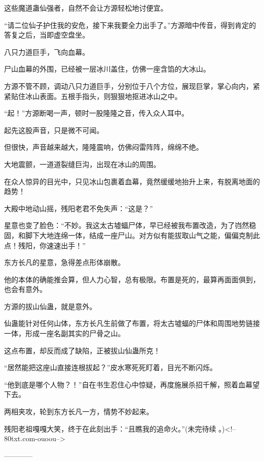 \begin{this_body}
这些魔道蛊仙强者，自然不会让方源轻松地讨便宜。

“请二位仙子护住我的安危，接下来我要全力出手了。”方源暗中传音，得到肯定的答复之后，当即虚空盘坐。

八只力道巨手，飞向血幕。

尸山血幕的外围，已经被一层冰川盖住，仿佛一座含馅的大冰山。

方源不管不顾，调动八只力道巨手，分别位于八个方位，展现巨掌，掌心向内，紧紧贴住冰山表面。五根手指头，则狠狠地抠进冰山之中。

“起！”方源断喝一声，顿时一股隆隆之音，传入众人耳中。

起先这股声音，只是微不可闻。

但很快，声音越来越大，隆隆震响，仿佛闷雷阵阵，绵绵不绝。

大地震颤，一道道裂缝巨沟，出现在冰山的周围。

在众人惊异的目光中，只见冰山包裹着血幕，竟然缓缓地抬升上来，有脱离地面的趋势！

大殿中地动山摇，残阳老君不免失声：“这是？”

星意也变了脸色：“不妙。我这太古墟蝠尸体，早已经被我布置改造，为了岿然稳固，和脚下大地连绵一体，结成一座尸山。对方似有能拔取山气之能，偏偏克制此点！残阳，你速速出手！”

东方长凡的星意，急得差点形体崩散。

他的本体的确能推会算，但人力心智，总有极限。布置是死的，最算再面面俱到，也会有意外。

方源的拔山仙蛊，就是意外。

仙蛊能针对任何山体，东方长凡生前做了布置，将太古墟蝠的尸体和周围地势链接一体，形成一座名副其实的尸骨之山。

这点布置，却反而成了缺陷，正被拔山仙蛊所克！

“居然能把这座山直接连根拔起？”皮水寒死死盯着，目光不断闪烁。

“他到底是哪个人物？！”自在书生忍住心中惊疑，再度施展杀招千解，照着血幕望下去。

两相夹攻，轮到东方长凡一方，情势不妙起来。

残阳老祖嘎嘎大笑，终于在此刻出手：“且瞧我的追命火。”(未完待续 。)<!--80txt.com-ouoou-->

------------

\end{this_body}

